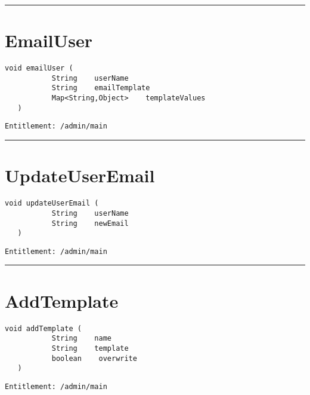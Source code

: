 \rule{12cm}{2pt}
\section{EmailUser}
\label{Api:EmailUser}
\begin{lstlisting}[style=nonumbers]
   void emailUser (
           String    userName
           String    emailTemplate
           Map<String,Object>    templateValues
   )
\end{lstlisting}
\begin{Verbatim}[formatcom=\color{Maroon}]
  Entitlement: /admin/main
\end{Verbatim}



\rule{12cm}{2pt}
\section{UpdateUserEmail}
\label{Api:UpdateUserEmail}
\begin{lstlisting}[style=nonumbers]
   void updateUserEmail (
           String    userName
           String    newEmail
   )
\end{lstlisting}
\begin{Verbatim}[formatcom=\color{Maroon}]
  Entitlement: /admin/main
\end{Verbatim}



\rule{12cm}{2pt}
\section{AddTemplate}
\label{Api:AddTemplate}
\begin{lstlisting}[style=nonumbers]
   void addTemplate (
           String    name
           String    template
           boolean    overwrite
   )
\end{lstlisting}
\begin{Verbatim}[formatcom=\color{Maroon}]
  Entitlement: /admin/main
\end{Verbatim}



